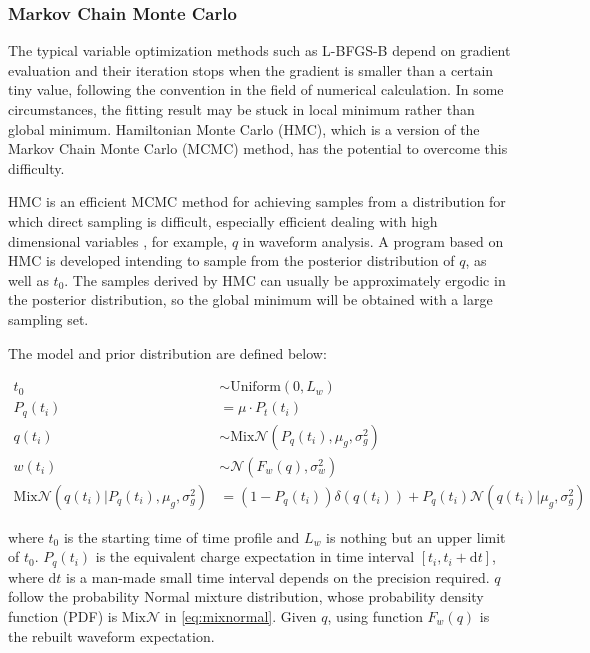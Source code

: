 \subsubsection{Markov Chain Monte Carlo}

The typical variable optimization methods such as L-BFGS-B depend on gradient evaluation and their iteration stops when the gradient is smaller than a certain tiny value, following the convention in the field of numerical calculation. In some circumstances, the fitting result may be stuck in local minimum rather than global minimum. Hamiltonian Monte Carlo (HMC), which is a version of the Markov Chain Monte Carlo (MCMC) method, has the potential to overcome this difficulty. 

HMC is an efficient MCMC method for achieving samples from a distribution for which direct sampling is difficult, especially efficient dealing with high dimensional variables \cite{neal_mcmc_2012}, for example, $q$ in waveform analysis. A program based on HMC is developed intending to sample from the posterior distribution of $q$, as well as $t_{0}$. The samples derived by HMC can usually be approximately ergodic in the posterior distribution, so the global minimum will be obtained with a large sampling set. 

The model and prior distribution are defined below: 

\begin{align}
    t_{0} &\sim \mathrm{Uniform}(0, L_{w}) \\
    P_{q}(t_{i}) &= \mu \cdot P_{t}(t_{i}) \\
    q(t_{i}) &\sim \mathrm{Mix}\mathcal{N}(P_{q}(t_{i}), \mu_{g}, \sigma_{g}^{2}) \\
    w(t_{i}) &\sim \mathcal{N}(F_{w}(q), \sigma_{w}^{2}) \\
    \mathrm{Mix}\mathcal{N}(q(t_{i}) | P_{q}(t_{i}), \mu_{g}, \sigma_{g}^{2}) &= (1 - P_{q}(t_{i}))\delta(q(t_{i})) + P_{q}(t_{i})\mathcal{N}(q(t_{i}) | \mu_{g}, \sigma_{g}^{2}) \label{eq:mixnormal}
\end{align}

where $t_{0}$ is the starting time of time profile and $L_{w}$ is nothing but an upper limit of $t_{0}$. $P_{q}(t_{i})$ is the equivalent charge expectation in time interval $[t_{i}, t_{i}+\mathrm{d}t]$, where $\mathrm{d}t$ is a man-made small time interval depends on the precision required. $q$ follow the probability Normal mixture distribution, whose probability density function (PDF) is $\mathrm{Mix}\mathcal{N}$ in \eqref{eq:mixnormal}. Given $q$, using function $F_{w}(q)$ is the rebuilt waveform expectation. 

